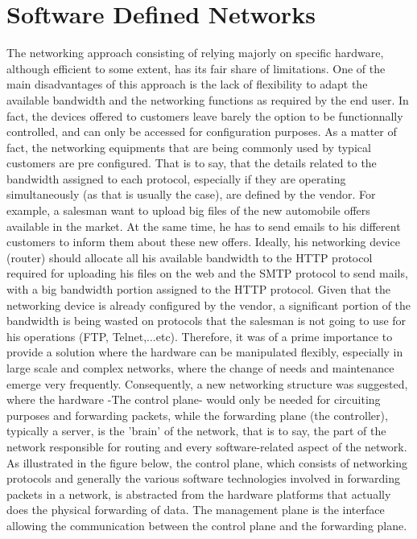 \section{Software Defined Networks}
The networking approach consisting of relying majorly on specific hardware, although efficient to some extent, has its fair share of limitations. One of the main disadvantages of this approach is the lack of flexibility to adapt the available bandwidth and the networking functions as required by the end user. In fact, the devices offered to customers leave barely the option to be functionnally controlled, and can only be accessed for configuration purposes. As a matter of fact, the networking equipments that are being commonly used by typical customers are pre configured. That is to say, that the details related to the bandwidth assigned to each protocol, especially if they are operating simultaneously (as that is usually the case), are defined by the vendor. For example, a salesman want to upload big files of the new automobile offers available in the market. At the same time, he has to send emails to his different customers to inform them about these new offers. Ideally, his networking device (router) should allocate all his available bandwidth to the HTTP protocol required for uploading his files on the web and the SMTP protocol to send mails, with a big bandwidth portion assigned to the HTTP protocol. Given that the networking device is already configured by the vendor, a significant portion of the bandwidth is being wasted on protocols that the  salesman is not going to use for his operations (FTP, Telnet,...etc). Therefore, it was of a prime importance to provide a solution where the hardware can be manipulated flexibly, especially in large scale and complex networks, where the change of needs and maintenance emerge very frequently. Consequently, a new networking structure was suggested, where the hardware -The control plane- would only be needed for circuiting purposes and forwarding packets, while the forwarding plane (the controller), typically a server, is the ’brain’ of the network, that is to say, the part of the network responsible for routing and every software-related aspect of the network. As illustrated in the figure below, the control plane, which consists of networking protocols and generally the various software technologies involved in forwarding packets in a network, is abstracted from the hardware platforms that actually does the physical forwarding of data. The management plane is the interface allowing the communication between the control plane and the forwarding plane.
